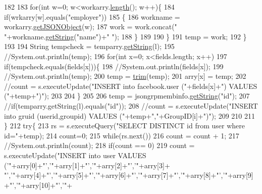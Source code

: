 \begin{DoxyCode}
182         
183         \textcolor{keywordflow}{for}(\textcolor{keywordtype}{int} w=0; w<workarry.\hyperlink{classorg_1_1json_1_1_j_s_o_n_array_a8382a78090007f650a02895ecbf3c8ec}{length}(); w++)\{
184             \textcolor{keywordflow}{if}(wrkarry[w].equals(\textcolor{stringliteral}{"employer"}))
185             \{
186                 workname = workarry.\hyperlink{classorg_1_1json_1_1_j_s_o_n_array_a7f3e6fc64826daba30f40964cd92e57e}{getJSONObject}(w);
187                 work = work.concat(\textcolor{stringliteral}{" "}+workname.\hyperlink{classorg_1_1json_1_1_j_s_o_n_object_a7140df2bac96f4d75a3f338ed16d1212}{getString}(\textcolor{stringliteral}{"name"})+\textcolor{stringliteral}{" "});
188             \}
189             
190         \}
191         temp = work;
192     \}
193     
194     String tempcheck = temparry.\hyperlink{classorg_1_1json_1_1_j_s_o_n_array_a3b52ac3d94f48cdddf503e7872653591}{getString}(l);
195     \textcolor{comment}{//System.out.println(temp);}
196     \textcolor{keywordflow}{for}(\textcolor{keywordtype}{int} x=0; x<fields.length; x++)
197     \textcolor{keywordflow}{if}(tempcheck.equals(fields[x]))\{
198         \textcolor{comment}{//System.out.println(fields[x]);}
199         \textcolor{comment}{//System.out.println(temp);}
200          temp = \hyperlink{class_json_reader_a1e66d7d6d5a663c69d3eb60c9a81839a}{trim}(temp);
201         arry[x] = temp;
202         \textcolor{comment}{//count = s.executeUpdate("INSERT into facebook.user ("+fields[x]+") VALUES ("+temp+")");}
203         
204     \}
205     
206     temp = jsongrpmembinfo.\hyperlink{classorg_1_1json_1_1_j_s_o_n_object_a7140df2bac96f4d75a3f338ed16d1212}{getString}(\textcolor{stringliteral}{"id"});
207     \textcolor{comment}{//if(temparry.getString(l).equals("id"));}
208       \textcolor{comment}{//count = s.executeUpdate("INSERT into gruid (userid,groupid) VALUES ("+temp+","+GroupID[i]+")"); }
209     
210     
211     \}
212     \textcolor{keywordflow}{try}\{
213     rs = s.executeQuery(\textcolor{stringliteral}{"SELECT DISTINCT id from user where id="}+temp);
214     count=0;
215     \textcolor{keywordflow}{while}(rs.next())
216     count = count + 1;
217     \textcolor{comment}{//System.out.println(count);}
218     \textcolor{keywordflow}{if}(count == 0)
219     count = s.executeUpdate(\textcolor{stringliteral}{"INSERT into user VALUES ('"}+arry[0]+\textcolor{stringliteral}{"','"}+arry[1]+\textcolor{stringliteral}{"','"}+arry[2]+\textcolor{stringliteral}{"','"}+arry[3]+\textcolor{stringliteral}{
      "','"}+arry[4]+\textcolor{stringliteral}{"','"}+arry[5]+\textcolor{stringliteral}{"','"}+arry[6]+\textcolor{stringliteral}{"','"}+arry[7]+\textcolor{stringliteral}{"','"}+arry[8]+\textcolor{stringliteral}{"','"}+arry[9]+\textcolor{stringliteral}{"','"}+arry[10]+\textcolor{stringliteral}{"','"}+

\end{DoxyCode}
